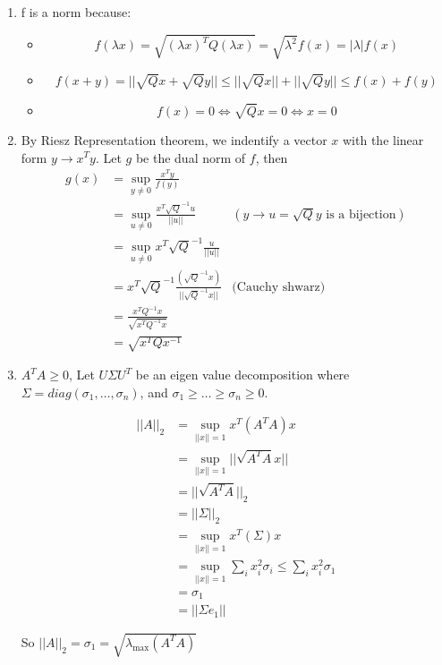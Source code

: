 \documentclass[12pt]{article}
\begin{document}
\begin{enumerate}
\item f is a norm because:

  \begin{itemize}
  \item $$f(\lambda x) = \sqrt{(\lambda x)^TQ(\lambda x)} = \sqrt{\lambda^2} f(x) = |\lambda| f(x)$$
  \item
    $$f(x + y) = ||\sqrt{Q}x + \sqrt{Q}y|| \le ||\sqrt{Q}x|| + ||\sqrt{Q}y|| \le f(x)+ f(y)$$
  \item $$f(x) = 0 \iff \sqrt{Q}x = 0 \iff x = 0$$
  \end{itemize}
\item

  By Riesz Representation theorem, we indentify a vector $x$ with the linear form $y \rightarrow x^Ty$.
  Let $g$ be the dual norm of $f$, then
  \begin{align*}
    g(x) &= \sup_{y \ne 0} \frac{x^Ty}{f(y)}
    \\&= \sup_{u \ne 0} \frac{x^T\sqrt{Q}^{-1}u}{||u||} &(y \rightarrow u=\sqrt{Q}y \text{ is a bijection})
    \\&= \sup_{u \ne 0} x^T\sqrt{Q}^{-1}\frac{u}{||u||}
    \\&= x^T\sqrt{Q}^{-1}\frac{(\sqrt{Q}^{-1}x)}{||\sqrt{Q}^{-1}x||} &\text{(Cauchy shwarz)}
    \\&= \frac{x^TQ^{-1}x}{\sqrt{x^TQ^{-1}x}}
    \\ &= \sqrt{x^TQx^{-1}}
  \end{align*}

\item
  $A^TA \ge 0$, Let $U\Sigma U^T$ be an eigen value decomposition where $\Sigma = diag(\sigma_1, \ldots, \sigma_n)$, and $\sigma_1 \ge \ldots \ge \sigma_n \ge 0$.
  
  \begin{align*}
    ||A||_2 &= \sup_{||x||=1} x^T(A^TA)x
    \\&= \sup_{||x||=1} ||\sqrt{A^TA}x||
    \\&= ||\sqrt{A^TA}||_2
    \\&= ||\Sigma||_2 \\&= \sup_{||x||=1} x^T(\Sigma)x \\&= \sup_{||x||=1} \sum_i x_i^2 \sigma_i \le \sum_{i} x_i^2 \sigma_1 \\&= \sigma_1 \\&= ||\Sigma e_1||
  \end{align*}

  So $||A||_2 = \sigma_1 = \sqrt{\lambda_{\text{max}}(A^TA)}$

\end{enumerate}
\end{document}
